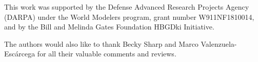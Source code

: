 This work was supported by the Defense Advanced Research Projects Agency
(DARPA) under the World Modelers program, grant number
W911NF1810014, and by the Bill and Melinda
Gates Foundation HBGDki Initiative.

 The authors would also like to thank Becky Sharp and Marco Valenzuela-Escárcega for all their valuable comments and reviews.

